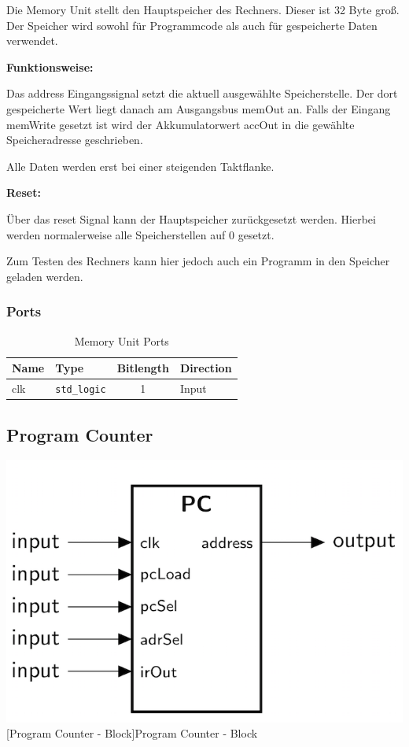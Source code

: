Die Memory Unit stellt den Hauptspeicher des Rechners. Dieser ist 32 Byte groß. Der Speicher wird sowohl für Programmcode als auch für gespeicherte Daten verwendet.

\textbf{Funktionsweise:}

Das address Eingangssignal setzt die aktuell ausgewählte Speicherstelle. Der dort gespeicherte Wert liegt danach am Ausgangsbus memOut an.
Falls der Eingang memWrite gesetzt ist wird der Akkumulatorwert accOut in die gewählte Speicheradresse geschrieben.

Alle Daten werden erst bei einer steigenden Taktflanke.

\textbf{Reset:}

Über das reset Signal kann der Hauptspeicher zurückgesetzt werden. Hierbei werden normalerweise alle Speicherstellen auf 0 gesetzt.

Zum Testen des Rechners kann hier jedoch auch ein Programm in den Speicher geladen werden.

\subsubsection{Ports}

\vspace{1em}
\begin{table}[!h]
	\centering
	\begin{tabular}{|l|l|c|l|}
		\hline
		\textbf{Name} & \textbf{Type} & \textbf{Bitlength} & \textbf{Direction}\\
		\hline
		clk & \texttt{std\_logic} & 1 & Input \\
		\hline
	\end{tabular}
	\caption{Memory Unit Ports}
	\label{tab:mem_ports}
\end{table}


\pagebreak
\subsection{Program Counter}

\vspace{1em}
\begin{minipage}{\linewidth}
    \centering
    \includegraphics[width=0.4\linewidth]{images/PC.png}\\
    [Program Counter - Block]{Program Counter - Block}
    \label{fig:pc_block}
\end{minipage}

